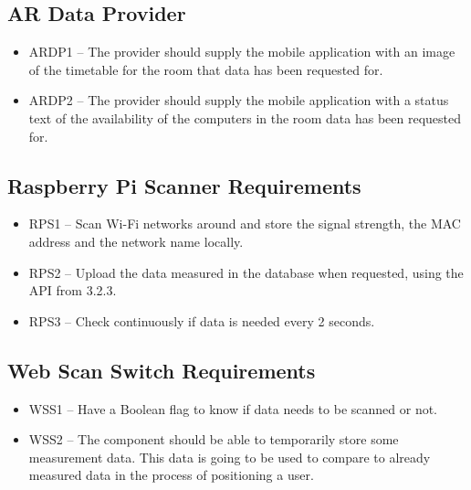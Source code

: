 \subsection{AR Data Provider}
\label{sec:ar-data-provider}
\begin{itemize}
    \item ARDP1 – The provider should supply the mobile application with an image of the timetable for the room that data has been requested for.
    \item ARDP2 – The provider should supply the mobile application with a status text of the availability of the computers in the room data has been requested for.
\end{itemize}

\subsection{Raspberry Pi Scanner Requirements}
\label{sec:rasp-pi-scanner}
\begin{itemize}
    \item RPS1 – Scan Wi-Fi networks around and store the signal strength, the MAC address and the network name locally.
    \item RPS2 – Upload the data measured in the database when requested, using the API from 3.2.3.
    \item RPS3 – Check continuously if data is needed every 2 seconds.
\end{itemize}

\subsection{Web Scan Switch Requirements}
\label{sec:web-scan-switch}
\begin{itemize}
    \item WSS1 – Have a Boolean flag to know if data needs to be scanned or not.
    \item WSS2 – The component should be able to temporarily store some measurement data. This data is going to be used to compare to already measured data in the process of positioning a user.
\end{itemize}

